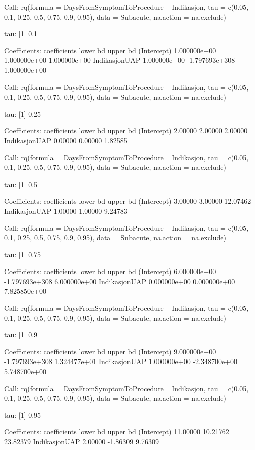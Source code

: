 \documentclass[a4paper]{report}
\begin{document}
\begin{itemize}
{\begin{Schunk}
\begin{Soutput}
Call: rq(formula = DaysFromSymptomToProcedure ~ Indikasjon, tau = c(0.05, 
    0.1, 0.25, 0.5, 0.75, 0.9, 0.95), data = Subacute, na.action = na.exclude)

tau: [1] 0.1

Coefficients:
              coefficients   lower bd       upper bd      
(Intercept)     1.000000e+00   1.000000e+00   1.000000e+00
IndikasjonUAP   1.000000e+00 -1.797693e+308   1.000000e+00

Call: rq(formula = DaysFromSymptomToProcedure ~ Indikasjon, tau = c(0.05, 
    0.1, 0.25, 0.5, 0.75, 0.9, 0.95), data = Subacute, na.action = na.exclude)

tau: [1] 0.25

Coefficients:
              coefficients lower bd upper bd
(Intercept)   2.00000      2.00000  2.00000 
IndikasjonUAP 0.00000      0.00000  1.82585 

Call: rq(formula = DaysFromSymptomToProcedure ~ Indikasjon, tau = c(0.05, 
    0.1, 0.25, 0.5, 0.75, 0.9, 0.95), data = Subacute, na.action = na.exclude)

tau: [1] 0.5

Coefficients:
              coefficients lower bd upper bd
(Intercept)    3.00000      3.00000 12.07462
IndikasjonUAP  1.00000      1.00000  9.24783

Call: rq(formula = DaysFromSymptomToProcedure ~ Indikasjon, tau = c(0.05, 
    0.1, 0.25, 0.5, 0.75, 0.9, 0.95), data = Subacute, na.action = na.exclude)

tau: [1] 0.75

Coefficients:
              coefficients   lower bd       upper bd      
(Intercept)     6.000000e+00 -1.797693e+308   6.000000e+00
IndikasjonUAP   0.000000e+00   0.000000e+00   7.825850e+00

Call: rq(formula = DaysFromSymptomToProcedure ~ Indikasjon, tau = c(0.05, 
    0.1, 0.25, 0.5, 0.75, 0.9, 0.95), data = Subacute, na.action = na.exclude)

tau: [1] 0.9

Coefficients:
              coefficients   lower bd       upper bd      
(Intercept)     9.000000e+00 -1.797693e+308   1.324477e+01
IndikasjonUAP   1.000000e+00  -2.348700e+00   5.748700e+00

Call: rq(formula = DaysFromSymptomToProcedure ~ Indikasjon, tau = c(0.05, 
    0.1, 0.25, 0.5, 0.75, 0.9, 0.95), data = Subacute, na.action = na.exclude)

tau: [1] 0.95

Coefficients:
              coefficients lower bd upper bd
(Intercept)   11.00000     10.21762 23.82379
IndikasjonUAP  2.00000     -1.86309  9.76309
\end{Soutput}
\end{Schunk}

}
\end{itemize}
\end{document}
